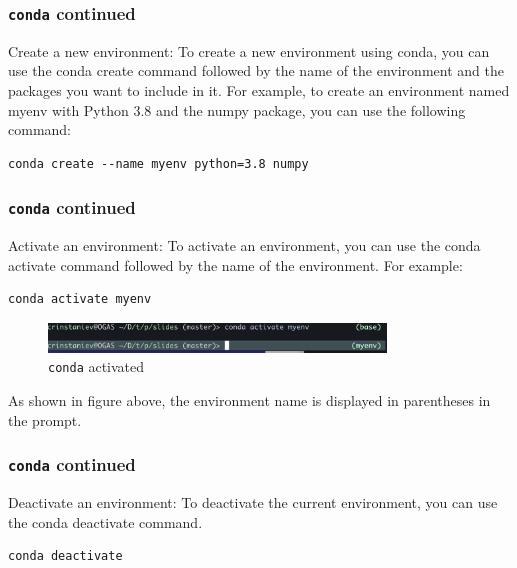 \documentclass{beamer}
\begin{document}
\begin{frame}[fragile]
  \frametitle{\texttt{conda} continued}

  Create a new environment: To create a new environment using conda, you can use the conda create command followed by the name of the environment and the packages you want to include in it. For example, to create an environment named myenv with Python 3.8 and the numpy package, you can use the following command:

  \begin{lstlisting}
conda create --name myenv python=3.8 numpy
\end{lstlisting}

\end{frame}

\begin{frame}[fragile]
  \frametitle{\texttt{conda} continued}

  Activate an environment: To activate an environment, you can use the conda activate command followed by the name of the environment. For example:

  \begin{lstlisting}
conda activate myenv
\end{lstlisting}

  \begin{figure}[ht]
    \centering
    \includegraphics[width=0.8\textwidth]{imgs/conda_activated.png}
    \caption{\texttt{conda} activated}
  \end{figure}

  As shown in figure above, the environment name is displayed in parentheses in the prompt.

\end{frame}

\begin{frame}[fragile]
  \frametitle{\texttt{conda} continued}

  Deactivate an environment: To deactivate the current environment, you can use the conda deactivate command.

  \begin{lstlisting}
conda deactivate
\end{lstlisting}

\end{frame}
\end{document}
